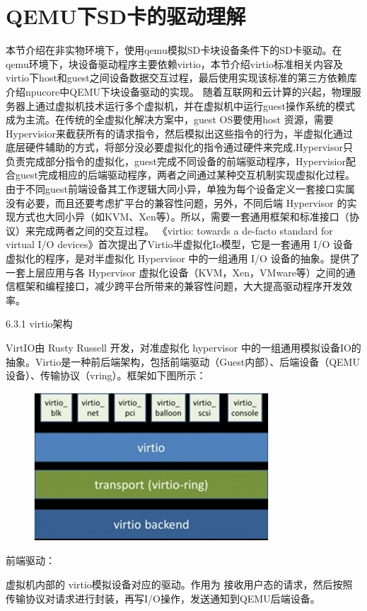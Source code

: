 \section{QEMU下SD卡的驱动理解}
本节介绍在非实物环境下，使⽤qemu模拟SD卡块设备条件下的SD卡驱动。在qemu环境下，块设备驱动程序主要依赖virtio，本节介绍virtio标准相关内容及virtio下host和guest之间设备数据交互过程，最后使⽤实现该标准的第三⽅依赖库介绍npucore中QEMU下块设备驱动的实现。
随着互联网和云计算的兴起，物理服务器上通过虚拟机技术运行多个虚拟机，并在虚拟机中运⾏guest操作系统的模式成为主流。在传统的全虚拟化解决⽅案中，guest OS要使⽤host 资源，需要Hypervisior来截获所有的请求指令，然后模拟出这些指令的⾏为，半虚拟化通过底层硬件辅助的⽅式，将部分没必要虚拟化的指令通过硬件来完成,Hypervisor只负责完成部分指令的虚拟化，guest完成不同设备的前端驱动程序，Hypervisior配合guest完成相应的后端驱动程序，两者之间通过某种交互机制实现虚拟化过程。由于不同guest前端设备其⼯作逻辑⼤同⼩异，单独为每个设备定义⼀套接⼝实属没有必要，⽽且还要考虑扩平台的兼容性问题，另外，不同后端 Hypervisor 的实现⽅式也⼤同⼩异（如KVM、Xen等）。所以，需要⼀套通⽤框架和标准接⼝（协议）来完成两者之间的交互过程。
《virtio: towards a de-facto standard for virtual I/O devices》⾸次提出了Virtio半虚拟化Io模型，它是⼀套通⽤ I/O 设备虚拟化的程序，是对半虚拟化 Hypervisor 中的⼀组通⽤ I/O 设备的抽象。提供了⼀套上层应⽤与各 Hypervisor 虚拟化设备（KVM，Xen，VMware等）之间的通信框架和编程接⼝，减少跨平台所带来的兼容性问题，大大提⾼驱动程序开发效率。

6.3.1 virtio架构

VirtIO由 Rusty Russell 开发，对准虚拟化 hypervisor 中的一组通用模拟设备IO的抽象。Virtio是一种前后端架构，包括前端驱动（Guest内部）、后端设备（QEMU设备）、传输协议（vring）。框架如下图所示：

 
\begin{figure}[H]
    \centering
    \includegraphics{figures/06-03-1.png}
\end{figure}
前端驱动：

虚拟机内部的 virtio模拟设备对应的驱动。作用为 接收用户态的请求，然后按照传输协议对请求进行封装，再写I/O操作，发送通知到QEMU后端设备。

